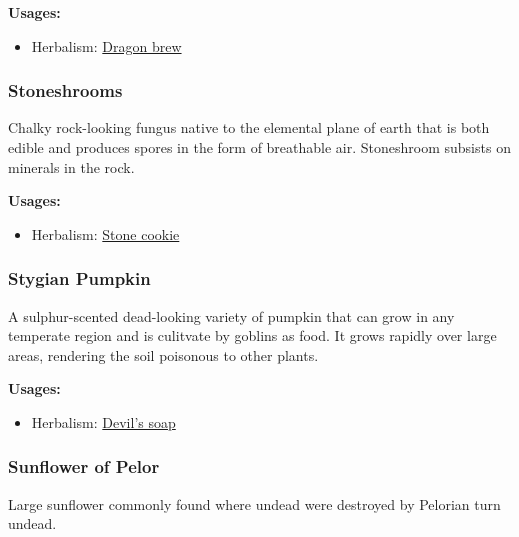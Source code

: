 \vspace{5mm}

\textbf{Usages:}

\begin{itemize}[noitemsep]
\item[] Herbalism: \hyperref[Dragon brew]{Dragon brew}
\end{itemize}

\subsubsection{Stoneshrooms}
\label{Stoneshrooms}

Chalky rock-looking fungus native to the elemental plane of earth that is both edible and produces spores in the form of breathable air. Stoneshroom subsists on minerals in the rock.

\vspace{5mm}

\textbf{Usages:}

\begin{itemize}[noitemsep]
\item[] Herbalism: \hyperref[Stone cookie]{Stone cookie}
\end{itemize}

\subsubsection{Stygian Pumpkin}
\label{Stygian Pumpkin}

A sulphur-scented dead-looking variety of pumpkin that can grow in any temperate region and is culitvate by goblins as food. It grows rapidly over large areas, rendering the soil poisonous to other plants.

\vspace{5mm}

\textbf{Usages:}

\begin{itemize}[noitemsep]
\item[] Herbalism: \hyperref[Devil's soap]{Devil's soap}
\end{itemize}

\subsubsection{Sunflower of Pelor}
\label{Sunflower of Pelor}

Large sunflower commonly found where undead were destroyed by Pelorian turn undead.

\vspace{5mm}

